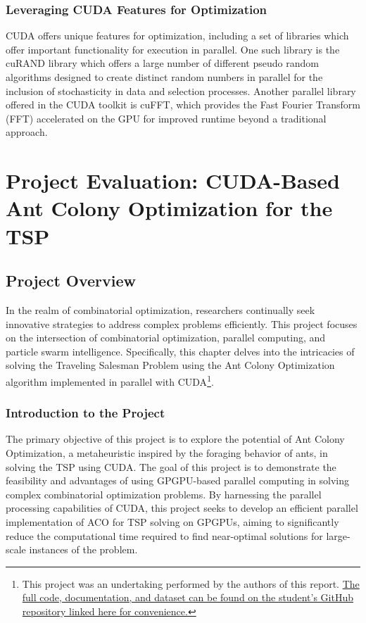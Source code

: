 \documentclass[11pt]{report}
\begin{document}
        \subsection{Leveraging CUDA Features for Optimization}
        CUDA offers unique features for optimization, including a set of libraries which offer important functionality for execution in parallel. One such library is the cuRAND library which offers a large number of different pseudo random algorithms designed to create distinct random numbers in parallel for the inclusion of stochasticity in data and selection processes\cite{CURAND}. Another parallel library offered in the CUDA toolkit is cuFFT, which provides the Fast Fourier Transform (FFT) accelerated on the GPU for improved runtime beyond a traditional approach\cite{CUFFT}. 


\chapter{Project Evaluation: CUDA-Based Ant Colony Optimization for the TSP}

    \section{Project Overview}
       In the realm of combinatorial optimization, researchers continually seek innovative strategies to address complex problems efficiently. This project focuses on the intersection of combinatorial optimization, parallel computing, and particle swarm intelligence. Specifically, this chapter delves into the intricacies of solving the Traveling Salesman Problem using the Ant Colony Optimization algorithm implemented in parallel with CUDA\footnote{This project was an undertaking performed by the authors of this report. \href{https://github.com/AStruthers2000/TravelingSalesmanProblem_CUDA}{The full code, documentation, and dataset can be found on the student's GitHub repository linked here for convenience.}}. 
    
        \subsection{Introduction to the Project}
        The primary objective of this project is to explore the potential of Ant Colony Optimization, a metaheuristic inspired by the foraging behavior of ants, in solving the TSP using CUDA. The goal of this project is to demonstrate the feasibility and advantages of using GPGPU-based parallel computing in solving complex combinatorial optimization problems. By harnessing the parallel processing capabilities of CUDA, this project seeks to develop an efficient parallel implementation of ACO for TSP solving on GPGPUs, aiming to significantly reduce the computational time required to find near-optimal solutions for large-scale instances of the problem. 
\end{document}
